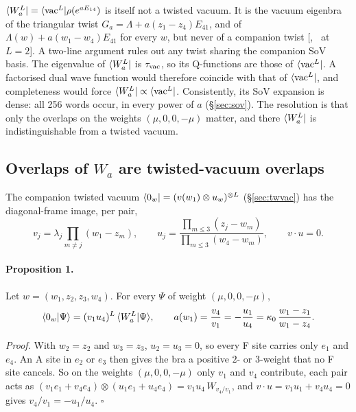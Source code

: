 $\langle W_a^L|=\langle\mathrm{vac}^L|\rho(e^{aE_{14}})$ is itself not a twisted vacuum. It is the vacuum eigenbra of the triangular twist
$G_a=\Lambda+a(z_1-z_4)E_{41}$, and of $\Lambda(w)+a(w_1-w_4)E_{41}$ for every $w$, but never of a companion twist
[, \ex\ at $L=2$]. A two-line argument rules out any twist sharing the companion SoV
basis. The eigenvalue of $\langle W_a^L|$ is $\tau_{\mathrm{vac}}$, so its Q-functions are those of $\langle\mathrm{vac}^L|$. A factorised dual wave
function would therefore coincide with that of $\langle\mathrm{vac}^L|$, and completeness would force $\langle W_a^L|\propto\langle\mathrm{vac}^L|$.
Consistently, its SoV expansion is dense: all 256 words occur, in every power of $a$ (\S\ref{sec:sov}). The resolution is
that only the overlaps on the weights $(\mu,0,0,-\mu)$ matter, and there $\langle W_a^L|$ is indistinguishable from a twisted
vacuum.

\subsection{Overlaps of $W_a$ are twisted-vacuum overlaps}\label{sec:qform-twvac}

The companion twisted vacuum $\langle0_w|=(v(w_1)\otimes u_w)^{\otimes L}$ (\S\ref{sec:twvac}) has the diagonal-frame image, per
pair, \ex
\begin{equation}
 v_j=\lambda_j\prod_{m\ne j}(w_1-z_m),\qquad u_j=\frac{\prod_{m\le3}(z_j-w_m)}{\prod_{m\le3}(w_4-w_m)},\qquad v\cdot u=0 .
\end{equation}

\paragraph{Proposition 1.} Let $w=(w_1,z_2,z_3,w_4)$. For every $\Psi$ of weight $(\mu,0,0,-\mu)$,
\begin{equation}\label{eq:qform-prop1}
 \langle0_w|\Psi\rangle=(v_1u_4)^L\,\langle W_a^L|\Psi\rangle,\qquad
 a(w_1)=\frac{v_4}{v_1}=-\frac{u_1}{u_4}=\kappa_0\,\frac{w_1-z_1}{w_1-z_4}.
\end{equation}

\emph{Proof.} With $w_2=z_2$ and $w_3=z_3$, $u_2=u_3=0$, so every F site carries only $e_1$ and $e_4$. An A site in $e_2$ or
$e_3$ then gives the bra a positive $2$- or $3$-weight that no F site cancels. So on the weights $(\mu,0,0,-\mu)$ only $v_1$ and
$v_4$ contribute, each pair acts as $(v_1e_1+v_4e_4)\otimes(u_1e_1+u_4e_4)=v_1u_4\,W_{v_4/v_1}$, and $v\cdot u=v_1u_1+v_4u_4=0$
gives $v_4/v_1=-u_1/u_4$. $\square$

